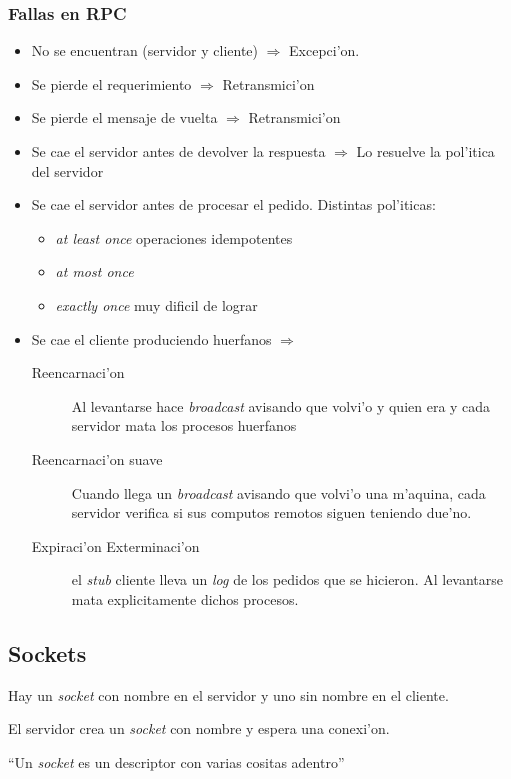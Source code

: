 \documentclass[a4paper,spanish]{article}
\begin{document}
\subsubsection{Fallas en RPC}
\begin{itemize}
	\item No se encuentran (servidor y cliente) $\Rightarrow$
Excepci'on.
	\item Se pierde el requerimiento $\Rightarrow$ Retransmici'on
	\item Se pierde el mensaje de vuelta $\Rightarrow$ Retransmici'on
	\item Se cae el servidor antes de devolver la respuesta
$\Rightarrow$ Lo resuelve la pol'itica del servidor
	\item Se cae el servidor antes de procesar el pedido. Distintas
pol'iticas:
		\begin{itemize}
			\item \emph{at least once} operaciones idempotentes
			\item \emph{at most once} 
			\item \emph{exactly once} muy dificil de lograr
		\end{itemize}
	\item Se cae el cliente produciendo huerfanos $\Rightarrow$
		\begin{description}
			\item[Reencarnaci'on] Al levantarse hace
\emph{broadcast} avisando que volvi'o y quien era y cada servidor mata los
procesos huerfanos
			\item[Reencarnaci'on suave] Cuando llega un
\emph{broadcast} avisando que volvi'o una m'aquina, cada servidor verifica si
sus computos remotos siguen teniendo due'no.
			\item[Expiraci'on Exterminaci'on] el \emph{stub}
cliente lleva un \emph{log} de los pedidos que se hicieron. Al levantarse mata
explicitamente dichos procesos.
		\end{description}
\end{itemize}

\subsection{Sockets}
Hay un \emph{socket} con nombre en el servidor y uno sin nombre en el cliente.

El servidor crea un \emph{socket} con nombre y espera una conexi'on.

``Un \emph{socket} es un descriptor con varias cositas adentro''
\end{document}
